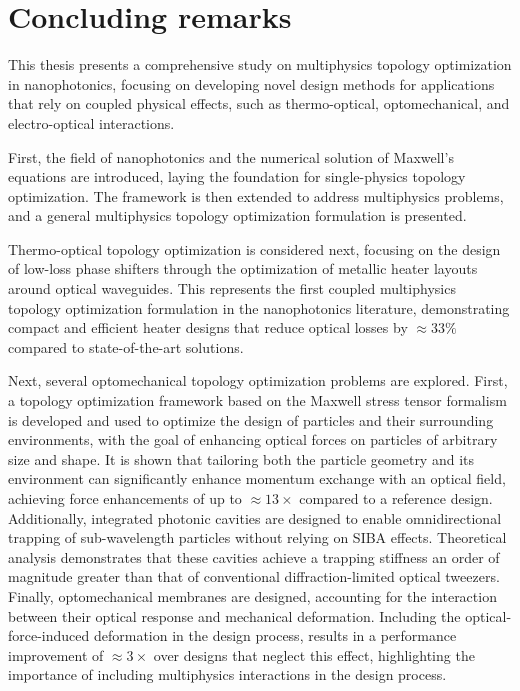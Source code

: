 \chapter{Concluding remarks}

This thesis presents a comprehensive study on multiphysics topology optimization in nanophotonics, focusing on developing novel design
methods for applications that rely on coupled physical effects, such as thermo-optical, optomechanical, and electro-optical interactions.

First, the field of nanophotonics and the numerical solution of Maxwell's equations are introduced, laying the foundation for single-physics topology optimization. The framework is then extended to address multiphysics
problems, and a general multiphysics topology optimization formulation is presented.

Thermo-optical topology optimization is considered next, focusing on the design of low-loss phase shifters through the optimization of metallic heater layouts around optical waveguides. This represents the first coupled multiphysics topology optimization formulation
in the nanophotonics literature, demonstrating compact and efficient heater designs that reduce optical losses by
$\approx 33\%$ compared to state-of-the-art solutions.

Next, several optomechanical topology optimization problems are explored. First, a topology optimization framework based on the Maxwell stress tensor formalism is developed and used to optimize the design of particles and their surrounding environments, with the goal of enhancing optical forces on particles of arbitrary size and shape.
It is shown that tailoring both the particle geometry and its
environment can significantly enhance momentum exchange with an optical field, achieving force enhancements of up to
$\approx 13\times$ compared to a reference design. Additionally, integrated photonic cavities are designed to enable omnidirectional trapping of sub-wavelength particles without relying on SIBA effects. Theoretical analysis demonstrates that these cavities achieve a trapping stiffness an order of magnitude greater than that of conventional diffraction-limited optical tweezers. Finally, optomechanical membranes are designed, accounting for the interaction between their optical response and mechanical deformation. Including the
optical-force-induced deformation in the design process, results in a performance improvement of $\approx 3\times$ over designs that
neglect this effect, highlighting the importance of including multiphysics interactions in the design process.

